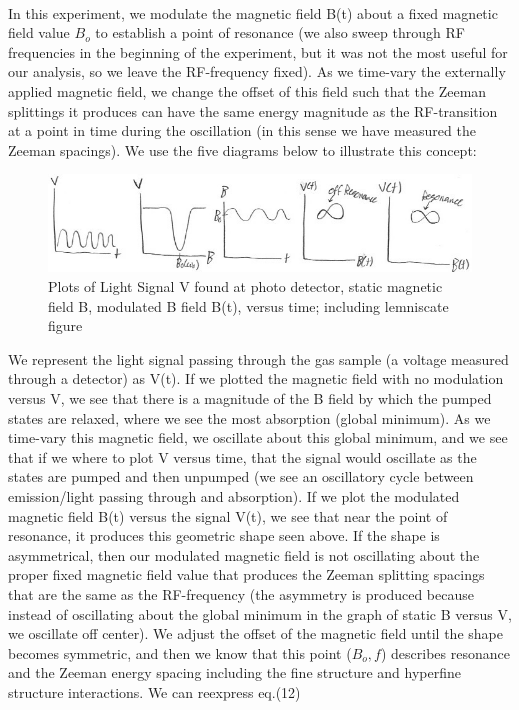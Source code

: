 \documentclass{article}
\begin{document}
    \\\indent In this experiment, we modulate the magnetic field B(t) about a fixed magnetic field value $B_o$ to establish a point of resonance (we also sweep through RF frequencies in the beginning of the experiment, but it was not the most useful for our analysis, so we leave the RF-frequency fixed). As we time-vary the externally applied magnetic field, we change the offset of this field such that the Zeeman splittings it produces can have the same energy magnitude as the RF-transition at a point in time during the oscillation (in this sense we have measured the Zeeman spacings). We use the five diagrams below to illustrate this concept: 
    \begin{figure}[H] %
        \centering
        \includegraphics[scale = 0.4]{16.jpg}
        \caption{Plots of Light Signal V found at photo detector, static magnetic field B, modulated B field B(t), versus time; including lemniscate figure}
        \label{fig:my_label}
    \end{figure}
    \indent We represent the light signal passing through the gas sample (a voltage measured through a detector) as V(t). If we plotted the magnetic field with no modulation versus V, we see that there is a magnitude of the B field by which the pumped states are relaxed, where we see the most absorption (global minimum). As we time-vary this magnetic field, we oscillate about this global minimum, and we see that if we where to plot V versus time, that the signal would oscillate as the states are pumped and then unpumped (we see an oscillatory cycle between emission/light passing through and absorption). If we plot the modulated magnetic field B(t) versus the signal V(t), we see that near the point of resonance, it produces this geometric shape seen above. If the shape is asymmetrical, then our modulated magnetic field is not oscillating about the proper fixed magnetic field value that produces the Zeeman splitting spacings that are the same as the RF-frequency (the asymmetry is produced because instead of oscillating about the global minimum in the graph of static B versus V, we oscillate off center). We adjust the offset of the magnetic field until the shape becomes symmetric, and then we know that this point ($B_o,f$) describes resonance and the Zeeman energy spacing including the fine structure and hyperfine structure interactions. We can reexpress eq.(12) %
\end{document}
